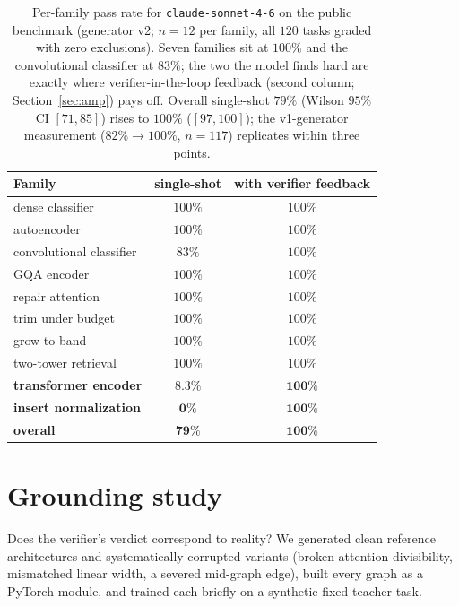\documentclass[11pt]{article}
\begin{document}
\begin{table}[t]
\centering
\small
\begin{tabular}{lcc}
\toprule
Family & single-shot & with verifier feedback \\
\midrule
dense classifier & $100\%$ & $100\%$ \\
autoencoder & $100\%$ & $100\%$ \\
convolutional classifier & $83\%$ & $100\%$ \\
GQA encoder & $100\%$ & $100\%$ \\
repair attention & $100\%$ & $100\%$ \\
trim under budget & $100\%$ & $100\%$ \\
grow to band & $100\%$ & $100\%$ \\
two-tower retrieval & $100\%$ & $100\%$ \\
\textbf{transformer encoder} & $\mathbf{8.3\%}$ & $\mathbf{100\%}$ \\
\textbf{insert normalization} & $\mathbf{0\%}$ & $\mathbf{100\%}$ \\
\midrule
\textbf{overall} & $\mathbf{79\%}$ & $\mathbf{100\%}$ \\
\bottomrule
\end{tabular}
\caption{Per-family pass rate for \texttt{claude-sonnet-4-6} on the public benchmark (generator v2; $n{=}12$ per family, all $120$ tasks graded with zero exclusions). Seven families sit at $100\%$ and the convolutional classifier at $83\%$; the two the model finds hard are exactly where verifier-in-the-loop feedback (second column; Section~\ref{sec:amp}) pays off. Overall single-shot $79\%$ (Wilson $95\%$ CI $[71,85]$) rises to $100\%$ ($[97,100]$); the v1-generator measurement ($82\%\to100\%$, $n{=}117$) replicates within three points.}
\label{tab:perfamily}
\end{table}

\section{Grounding study}
\label{sec:ground}
Does the verifier's verdict correspond to reality? We generated clean reference architectures and systematically corrupted variants (broken attention divisibility, mismatched linear width, a severed mid-graph edge), built every graph as a PyTorch module, and trained each briefly on a synthetic fixed-teacher task.
\end{document}
